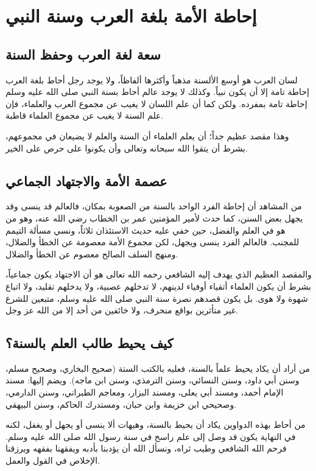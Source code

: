 \chapter{إحاطة الأمة بلغة العرب وسنة النبي}

\section{سعة لغة العرب وحفظ السنة}
لسان العرب هو أوسع الألسنة مذهباً وأكثرها ألفاظاً، ولا يوجد رجل أحاط بلغة العرب إحاطة تامة إلا أن يكون نبياً. وكذلك لا يوجد عالم أحاط بسنة النبي صلى الله عليه وسلم إحاطة تامة بمفرده. ولكن كما أن علم اللسان لا يغيب عن مجموع العرب والعلماء، فإن علم السنة لا يغيب عن مجموع العلماء قاطبة.

وهذا مقصد عظيم جداً؛ أن يعلم العلماء أن السنة والعلم لا يضيعان في مجموعهم، بشرط أن يتقوا الله سبحانه وتعالى وأن يكونوا على حرص على الخير. 

\section{عصمة الأمة والاجتهاد الجماعي}
من المشاهد أن إحاطة الفرد الواحد بالسنة من الصعوبة بمكان، فالعالم قد ينسى وقد يجهل بعض السنن، كما حدث لأمير المؤمنين عمر بن الخطاب رضي الله عنه، وهو من هو في العلم والفضل، حين خفي عليه حديث الاستئذان ثلاثاً، ونسي مسألة التيمم للمجنب. فالعالم الفرد ينسى ويجهل، لكن مجموع الأمة معصومة عن الخطأ والضلال، ومنهج السلف الصالح معصوم عن الخطأ والضلال. 

والمقصد العظيم الذي يهدف إليه الشافعي رحمه الله تعالى هو أن الاجتهاد يكون جماعياً، بشرط أن يكون العلماء أتقياء أوفياء لدينهم، لا تدخلهم عصبية، ولا يدخلهم تقليد، ولا اتباع شهوة ولا هوى. بل يكون قصدهم نصرة سنة النبي صلى الله عليه وسلم، متبعين للشرع غير متأثرين بواقع منحرف، ولا خائفين من أحد إلا من الله عز وجل.

\section{كيف يحيط طالب العلم بالسنة؟}
من أراد أن يكاد يحيط علماً بالسنة، فعليه بالكتب الستة (صحيح البخاري، وصحيح مسلم، وسنن أبي داود، وسنن النسائي، وسنن الترمذي، وسنن ابن ماجه). ويضم إليها: مسند الإمام أحمد، ومسند أبي يعلى، ومسند البزار، ومعاجم الطبراني، وسنن الدارمي، وصحيحي ابن خزيمة وابن حبان، ومستدرك الحاكم، وسنن البيهقي.

من أحاط بهذه الدواوين يكاد أن يحيط بالسنة، وهيهات ألا ينسى أو يجهل أو يغفل، لكنه في النهاية يكون قد وصل إلى علم راسخ في سنة رسول الله صلى الله عليه وسلم. فرحم الله الشافعي وطيب ثراه، ونسأل الله أن يؤدبنا بأدبه ويفقهنا بفقهه ويرزقنا الإخلاص في القول والعمل.

